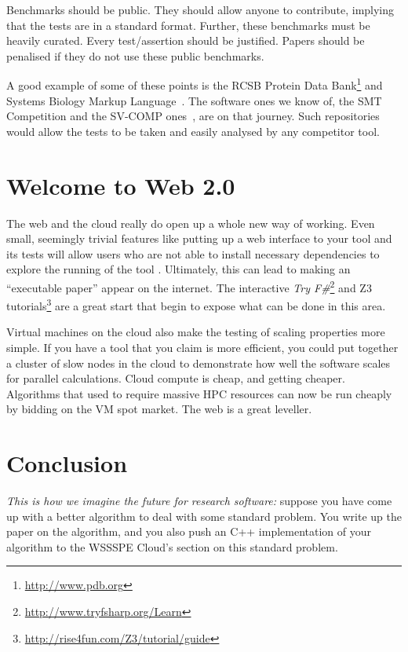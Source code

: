 \documentclass[conference]{IEEEtran}
\begin{document}
Benchmarks should be public. They should allow anyone to contribute,
implying that the tests are in a standard format. Further, these
benchmarks must be heavily curated. Every test/assertion should be
justified. Papers should be penalised if they do not use these public
benchmarks.

A good example of some of these points is the RCSB Protein Data
Bank\footnote{\url{http://www.pdb.org}} and Systems Biology Markup
Language~\cite{Hucka2003,Chaouiya2013}. The software ones we know of,
the SMT Competition and the SV-COMP ones~\cite{SMTComp2014,
SVCOMP2015}, are on that journey. Such repositories would allow the
tests to be taken and easily analysed by any competitor tool.

\section{Welcome to Web 2.0} 

The web and the cloud really do open up a whole new way of
working. Even small, seemingly trivial features like putting up a web
interface to your tool and its tests will allow users who are not able
to install necessary dependencies to explore the running of the tool
\cite{Hall2014}. Ultimately, this can lead to making an ``executable
paper'' appear on the internet. The interactive {\em Try
F\#}\footnote{\url{http://www.tryfsharp.org/Learn}} and Z3
tutorials\footnote{\url{http://rise4fun.com/Z3/tutorial/guide}} are a
great start that begin to expose what can be done in this area.

Virtual machines on the cloud also make the testing of scaling
properties more simple.  If you have a tool that you claim is more
efficient, you could put together a cluster of slow nodes in the cloud
to demonstrate how well the software scales for parallel calculations.
Cloud compute is cheap, and getting cheaper. Algorithms that used to
require massive HPC resources can now be run cheaply by bidding on the
VM spot market. The web is a great leveller.


\section{Conclusion}
\label{sec:Conclusion} 

{\emph{This is how we imagine the future for research software:}} suppose you
have come up with a better algorithm to deal with some standard
problem.  You write up the paper on the algorithm, and you also push
an C++ implementation of your algorithm to the WSSSPE Cloud's section
on this standard problem.
\end{document}

